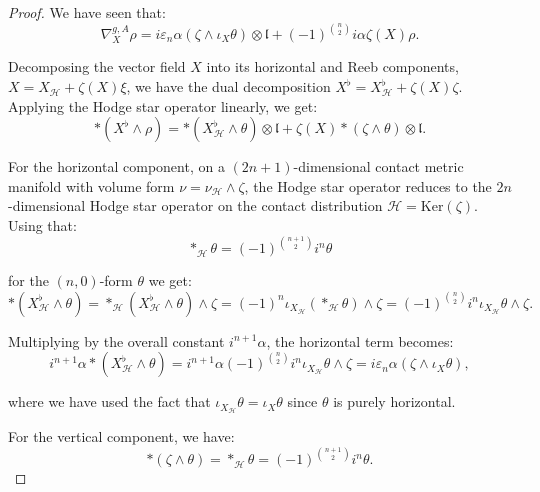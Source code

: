 \documentclass[10pt,a4paper,twoside,reqno]{amsart}
\theoremstyle{plain}
\theoremstyle{definition}
\theoremstyle{remark}
\renewcommand{\ker}{\mathrm{Ker}}
\begin{document}
\begin{proof}
We have seen that:
\begin{equation}
\label{eq:cov_deriv}
\nabla_{X}^{g,A}\rho = i\varepsilon_n\alpha(\zeta \wedge \iota_{X}\theta) \otimes \mathfrak{l} + (-1)^{\binom{n}{2}}i\alpha\zeta(X)\rho.
\end{equation}

\noindent
Decomposing the vector field $X$ into its horizontal and Reeb components, $X = X_{\mathcal{H}} + \zeta(X)\xi$, we have the dual decomposition $X^{\flat} = X_{\mathcal{H}}^{\flat} + \zeta(X)\zeta$. Applying the Hodge star operator linearly, we get:
\begin{equation*}
*(X^{\flat} \wedge \rho) = *(X_{\mathcal{H}}^{\flat} \wedge \theta)\otimes \mathfrak{l} + \zeta(X)*(\zeta \wedge \theta)\otimes \mathfrak{l}.
\end{equation*}

\noindent
For the horizontal component, on a $(2n+1)$-dimensional contact metric manifold with volume form $\nu=\nu_{\mathcal{H}}\wedge\zeta$, the Hodge star operator reduces to the $2n$-dimensional Hodge star operator on the contact distribution $\mathcal{H}=\ker(\zeta)$. Using that:
\begin{equation*}
*_{\mathcal{H}}\theta=(-1)^{\binom{n+1}{2}}i^n\theta
\end{equation*}

\noindent
for the $(n,0)$-form $\theta$ we get:
\begin{equation*}
*(X_{\mathcal{H}}^{\flat} \wedge \theta) = *_{\mathcal{H}}(X_{\mathcal{H}}^{\flat} \wedge \theta) \wedge \zeta = (-1)^n\iota_{X_{\mathcal{H}}}(*_{\mathcal{H}}\theta)\wedge\zeta = (-1)^{\binom{n}{2}}i^n \iota_{X_{\mathcal{H}}} \theta \wedge \zeta.
\end{equation*}

\noindent
Multiplying by the overall constant $i^{n+1}\alpha$, the horizontal term becomes:
\begin{equation*}
i^{n+1}\alpha *(X_{\mathcal{H}}^{\flat} \wedge \theta) = i^{n+1}\alpha (-1)^{\binom{n}{2}}i^n \iota_{X_{\mathcal{H}}} \theta \wedge \zeta = i\varepsilon_n\alpha(\zeta\wedge\iota_X\theta),
\end{equation*}

\noindent
where we have used the fact that $\iota_{X_{\mathcal{H}}}\theta = \iota_{X}\theta$ since $\theta$ is purely horizontal.\medskip

For the vertical component, we have:
\begin{equation*}
*(\zeta\wedge\theta)=*_{\mathcal{H}}\theta=(-1)^{\binom{n+1}{2}}i^n\theta.
\end{equation*}


\end{proof}
\end{document}
